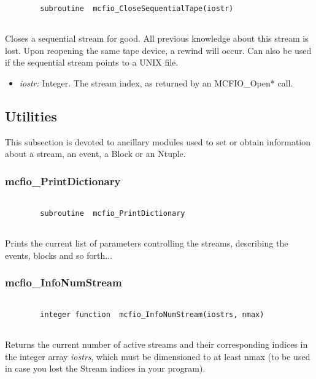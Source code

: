 \begin{verbatim}

        subroutine  mcfio_CloseSequentialTape(iostr)
    
\end{verbatim}

Closes a sequential stream for good. All previous knowledge 
about this stream is lost.  Upon reopening the same tape device, a rewind will 
occur. Can also be used if the sequential stream points to a UNIX file.  
\begin{itemize} 
\item {\em iostr:} Integer. The stream index, as returned by an MCFIO\_Open* 
call. 
\end{itemize}

\subsection{Utilities}

	This subsection is devoted to ancillary modules used to set or obtain 
information about a stream, an event, a Block or an Ntuple. 

\subsubsection{mcfio\_PrintDictionary}

\begin{verbatim}

        subroutine  mcfio_PrintDictionary
    
\end{verbatim}

Prints the current list of parameters controlling the streams, 
describing the events, blocks and so forth...

\subsubsection{mcfio\_InfoNumStream}

\begin{verbatim}

        integer function  mcfio_InfoNumStream(iostrs, nmax)
    
\end{verbatim}

Returns the current number of active streams and their 
corresponding indices in the integer array {\em iostrs}, which 
must be dimensioned to at least nmax (to be used in case you 
lost the Stream indices in your program).

